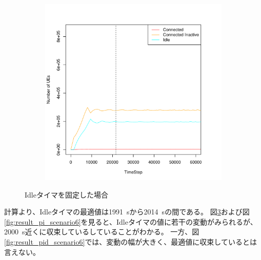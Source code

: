 \documentclass[a4j]{ujarticle}
\begin{document}
\begin{figure}[htbp]
\begin{subfigure}{0.49\hsize}
   \label{subfig:scenario_6_signaling_and_memoryload_vs_timeStep_0_86400}
 \end{subfigure}
 \begin{subfigure}{0.49\hsize}
   \centering
   \includegraphics[width=1.0\hsize]{scenario_6_stateBreakdown_0_86400.pdf}
   \label{subfig:scenario_6_stateBreakdown_0_86400}
 \end{subfigure}
 \caption{Idleタイマを固定した場合}
 \label{fig:result_p_scenario6}
\end{figure}

\clearpage
計算より、Idleタイマの最適値は1991~sから2014~sの間である。
図\ref{fig:result_p_scenario6}および図\ref{fig:result_pi_scenario6}を見ると、Idleタイマの値に若干の変動がみられるが、2000~s近くに収束しているしていることがわかる。
一方、図\ref{fig:result_pid_scenario6}では、変動の幅が大きく、最適値に収束しているとは言えない。
\end{document}
